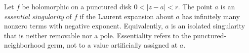 
Let $f$ be holomorphic on a punctured disk $0<|z-a|<r$. The point $a$ is an \emph{essential singularity} of $f$ if the Laurent expansion about $a$ has infinitely many nonzero terms with negative exponent. Equivalently, $a$ is an isolated singularity that is neither removable nor a pole. Essentiality refers to the punctured-neighborhood germ, not to a value artificially assigned at $a$.
